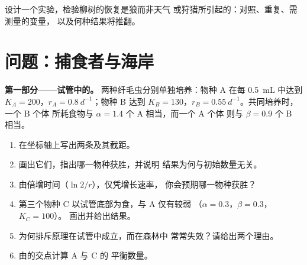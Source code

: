 \begin{exercise}[$\star\star\star$]\label{exo:b1:species-interactions:12}
设计一个实验，检验柳树的恢复是狼而非天气
或狩猎所引起的：对照、重复、需测量的变量，
以及何种结果将推翻。
\end{exercise}

\section{问题：捕食者与海岸}

\begin{problem}
\label{pb:b1:species-interactions:1}

\medskip
\noindent\textbf{第一部分——试管中的。}
两种纤毛虫分别单独培养：物种 A 在每
\qty{0.5}{mL} 中达到 $K_A = 200$，$r_A = \qty{0.8}{d^{-1}}$；物种 B 达到
$K_B = 130$，$r_B = \qty{0.55}{d^{-1}}$。共同培养时，一个 B 个体
所耗食物与 $\alpha = 1.4$ 个 A 相当，而一个 A 个体
则与 $\beta = 0.9$ 个 B 相当。
\begin{enumerate}
  \item 在坐标轴上写出两条及其截距。
  \item 画出它们，指出哪一物种获胜，并说明
        结果为何与初始数量无关。
  \item 由倍增时间（$\ln 2/r$），仅凭增长速率，
        你会预期哪一物种获胜？
  \item 第三个物种 C 以试管底部为食，与 A 仅有较弱
        （$\alpha = 0.3$，$\beta = 0.3$，$K_C = 100$）。
        画出并给出结果。
  \item 为何排斥原理在试管中成立，而在森林中
        常常失效？请给出两个理由。
  \item 由的交点计算 A 与 C 的
        平衡数量。
\end{enumerate}


\end{problem}
